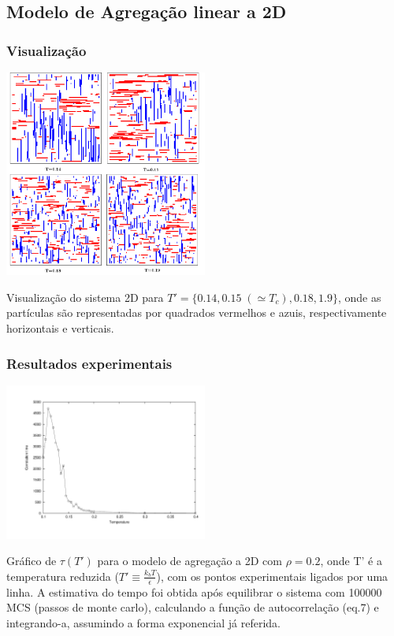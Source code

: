 \documentclass[a4paper,10pt]{article}
\makeatletter
\newenvironment{figurehere}
  {\def\@captype{figure}}
  {}
\makeatother
\begin{document}
\begin{multicols}{2}

\subsection{Modelo de Agregação linear a 2D}

\subsubsection{Visualização}

\begin{figurehere}
	\centering
		\includegraphics[width=0.5\textwidth]{images/rods2d}
	\caption{{\footnotesize Visualização do sistema 2D para $T' = \lbrace 0.14, 0.15 \; ( \simeq T_c ), 0.18, 1.9\rbrace$, onde as partículas são representadas por quadrados vermelhos e azuis, respectivamente horizontais e verticais.}}     
	\label{fig:2}
\end{figurehere}

\subsubsection{Resultados experimentais}

\begin{figurehere}
	\centering
		\includegraphics[width=0.5\textwidth]{images/ctimesr2d}
	\caption{{\footnotesize Gráfico de $\tau(T')$ para o modelo de agregação a 2D com $\rho = 0.2$, onde T' é a temperatura reduzida ($T'\equiv\frac{k_b T}{\epsilon}$), com os pontos experimentais ligados por uma linha. A estimativa do tempo foi obtida após equilibrar o sistema com 100000 MCS (passos de monte carlo), calculando a função de autocorrelação (eq.7) e integrando-a, assumindo a forma exponencial já referida.}}
	\label{fig:3}
\end{figurehere}


\end{multicols}
\end{document}
